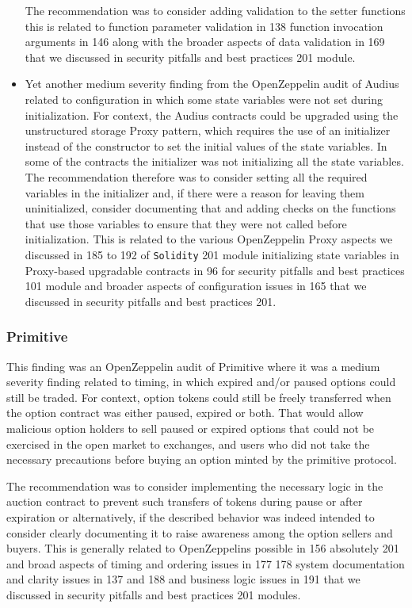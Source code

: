 \begin{itemize}
  The recommendation was to consider adding validation to the setter
  functions this is related to function parameter validation in 138
  function invocation arguments in 146 along with the broader aspects of
  data validation in 169 that we discussed in security pitfalls and best
  practices 201 module.
\item
  Yet another medium severity finding from the OpenZeppelin audit of
  Audius related to configuration in which some state variables were not
  set during initialization. For context, the Audius contracts could be
  upgraded using the unstructured storage Proxy pattern, which requires
  the use of an initializer instead of the constructor to set the
  initial values of the state variables. In some of the contracts the
  initializer was not initializing all the state variables.\\

  The recommendation therefore was to consider setting all the required
  variables in the initializer and, if there were a reason for leaving
  them uninitialized, consider documenting that and adding checks on the
  functions that use those variables to ensure that they were not called
  before initialization. This is related to the various OpenZeppelin
  Proxy aspects we discussed in 185 to 192 of \texttt{Solidity} 201
  module initializing state variables in Proxy-based upgradable
  contracts in 96 for security pitfalls and best practices 101 module
  and broader aspects of configuration issues in 165 that we discussed
  in security pitfalls and best practices 201.
\end{itemize}

\subsubsection{Primitive}\label{primitive}

This finding was an OpenZeppelin audit of Primitive where it was a
medium severity finding related to timing, in which expired and/or
paused options could still be traded. For context, option tokens could
still be freely transferred when the option contract was either paused,
expired or both. That would allow malicious option holders to sell
paused or expired options that could not be exercised in the open market
to exchanges, and users who did not take the necessary precautions
before buying an option minted by the primitive protocol.

The recommendation was to consider implementing the necessary logic in
the auction contract to prevent such transfers of tokens during pause or
after expiration or alternatively, if the described behavior was indeed
intended to consider clearly documenting it to raise awareness among the
option sellers and buyers. This is generally related to OpenZeppelins
possible in 156 absolutely 201 and broad aspects of timing and ordering
issues in 177 178 system documentation and clarity issues in 137 and 188
and business logic issues in 191 that we discussed in security pitfalls
and best practices 201 modules.

